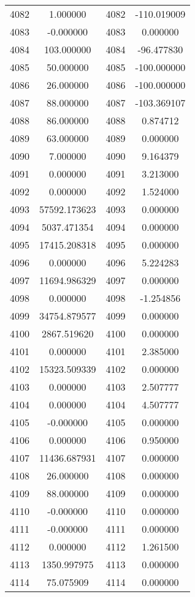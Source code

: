 \documentclass[12pt]{article}
\begin{document}
\begin{longtable}{@{}cccc@{}}
4082 & 1.000000 & 4082 & -110.019009 \\
4083 & -0.000000 & 4083 & 0.000000 \\
4084 & 103.000000 & 4084 & -96.477830 \\
4085 & 50.000000 & 4085 & -100.000000 \\
4086 & 26.000000 & 4086 & -100.000000 \\
4087 & 88.000000 & 4087 & -103.369107 \\
4088 & 86.000000 & 4088 & 0.874712 \\
4089 & 63.000000 & 4089 & 0.000000 \\
4090 & 7.000000 & 4090 & 9.164379 \\
4091 & 0.000000 & 4091 & 3.213000 \\
4092 & 0.000000 & 4092 & 1.524000 \\
4093 & 57592.173623 & 4093 & 0.000000 \\
4094 & 5037.471354 & 4094 & 0.000000 \\
4095 & 17415.208318 & 4095 & 0.000000 \\
4096 & 0.000000 & 4096 & 5.224283 \\
4097 & 11694.986329 & 4097 & 0.000000 \\
4098 & 0.000000 & 4098 & -1.254856 \\
4099 & 34754.879577 & 4099 & 0.000000 \\
4100 & 2867.519620 & 4100 & 0.000000 \\
4101 & 0.000000 & 4101 & 2.385000 \\
4102 & 15323.509339 & 4102 & 0.000000 \\
4103 & 0.000000 & 4103 & 2.507777 \\
4104 & 0.000000 & 4104 & 4.507777 \\
4105 & -0.000000 & 4105 & 0.000000 \\
4106 & 0.000000 & 4106 & 0.950000 \\
4107 & 11436.687931 & 4107 & 0.000000 \\
4108 & 26.000000 & 4108 & 0.000000 \\
4109 & 88.000000 & 4109 & 0.000000 \\
4110 & -0.000000 & 4110 & 0.000000 \\
4111 & -0.000000 & 4111 & 0.000000 \\
4112 & 0.000000 & 4112 & 1.261500 \\
4113 & 1350.997975 & 4113 & 0.000000 \\
4114 & 75.075909 & 4114 & 0.000000 \\

\end{longtable}
\end{document}
